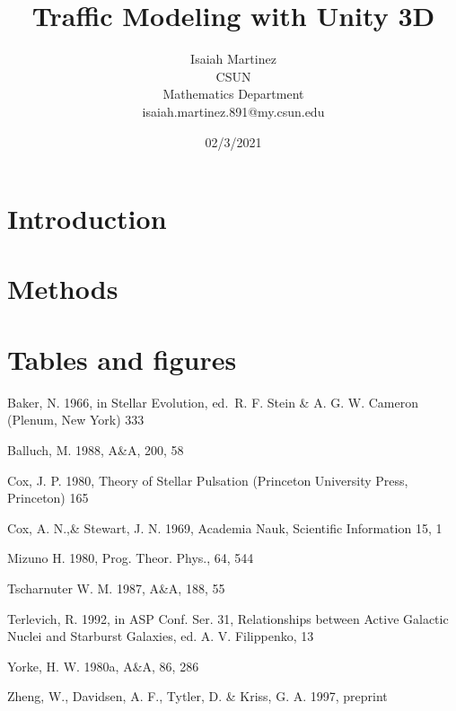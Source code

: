 \documentclass[a4paper,10pt]{article}
\begin{document}
%
    \title{Traffic Modeling with Unity 3D}

    \author{Isaiah Martinez \\ CSUN \\ Mathematics Department \\ isaiah.martinez.891@my.csun.edu}
          
    \date{02/3/2021}

    \maketitle
   
    \tableofcontents
 
    \newpage

    \section{Introduction}

    \section{Methods}

    \newpage
    \section{Tables and figures}

    \begin{thebibliography}{}

     Baker, N. 1966,
        in Stellar Evolution,
        ed.\ R. F. Stein \& A. G. W. Cameron
        (Plenum, New York) 333

     Balluch, M. 1988,
        A\&A, 200, 58

     Cox, J. P. 1980,
        Theory of Stellar Pulsation
        (Princeton University Press, Princeton) 165

     Cox, A. N.,\& Stewart, J. N. 1969,
        Academia Nauk, Scientific Information 15, 1

     Mizuno H. 1980,
        Prog. Theor. Phys., 64, 544
    
     Tscharnuter W. M. 1987,
        A\&A, 188, 55
    
     Terlevich, R. 1992, in ASP Conf. Ser. 31, 
        Relationships between Active Galactic Nuclei and Starburst Galaxies, 
        ed. A. V. Filippenko, 13

     Yorke, H. W. 1980a,
        A\&A, 86, 286

     Zheng, W., Davidsen, A. F., Tytler, D. \& Kriss, G. A.
        1997, preprint
    \end{thebibliography}
\end{document}

